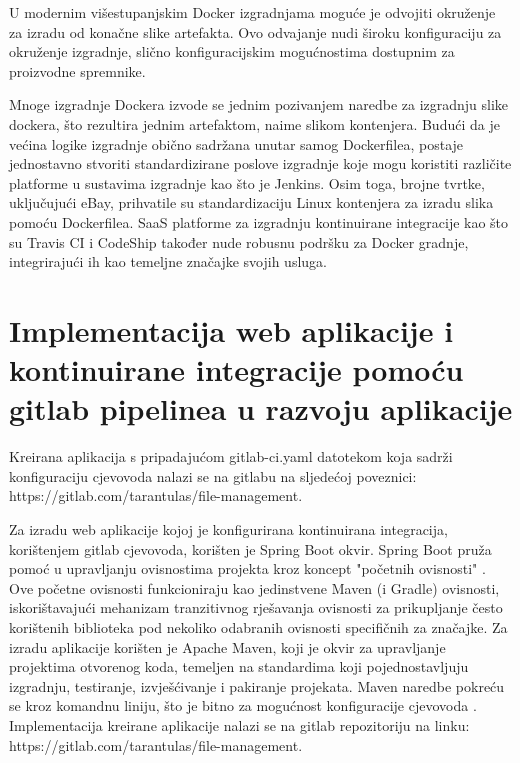 \documentclass[a4paper,12pt,oneside]{article}
\begin{document}
U modernim višestupanjskim Docker izgradnjama moguće je odvojiti okruženje za izradu od konačne slike artefakta. Ovo odvajanje nudi široku konfiguraciju za okruženje izgradnje, slično konfiguracijskim mogućnostima dostupnim za proizvodne spremnike.

Mnoge izgradnje Dockera izvode se jednim pozivanjem naredbe za izgradnju slike dockera, što rezultira jednim artefaktom, naime slikom kontenjera. Budući da je većina logike izgradnje obično sadržana unutar samog Dockerfilea, postaje jednostavno stvoriti standardizirane poslove izgradnje koje mogu koristiti različite platforme u sustavima izgradnje kao što je Jenkins. Osim toga, brojne tvrtke, uključujući eBay, prihvatile su standardizaciju Linux kontenjera za izradu slika pomoću Dockerfilea. SaaS platforme za izgradnju kontinuirane integracije kao što su Travis CI i CodeShip također nude robusnu podršku za Docker gradnje, integrirajući ih kao temeljne značajke svojih usluga.

\newpage

\section{Implementacija web aplikacije i kontinuirane integracije pomoću gitlab pipelinea u razvoju aplikacije}

Kreirana aplikacija s pripadajućom gitlab-ci.yaml datotekom koja sadrži konfiguraciju cjevovoda nalazi se na gitlabu na sljedećoj poveznici: https://gitlab.com/tarantulas/file-management. 

 Za izradu web aplikacije kojoj je konfigurirana kontinuirana integracija, korištenjem gitlab cjevovoda, korišten je Spring Boot okvir. Spring Boot pruža pomoć u upravljanju ovisnostima projekta kroz koncept "početnih ovisnosti" \cite{walls2016spring}. Ove početne ovisnosti funkcioniraju kao jedinstvene Maven (i Gradle) ovisnosti, iskorištavajući mehanizam tranzitivnog rješavanja ovisnosti za prikupljanje često korištenih biblioteka pod nekoliko odabranih ovisnosti specifičnih za značajke.\cite{springBootInAction} Za izradu aplikacije korišten je Apache Maven, koji je okvir za upravljanje projektima otvorenog koda, temeljen na standardima koji pojednostavljuju izgradnju, testiranje, izvješćivanje i pakiranje projekata. Maven naredbe pokreću se kroz komandnu liniju, što je bitno za mogućnost konfiguracije cjevovoda \cite{springBootInAction}. Implementacija kreirane aplikacije nalazi se na gitlab repozitoriju na linku: https://gitlab.com/tarantulas/file-management.
\end{document}
